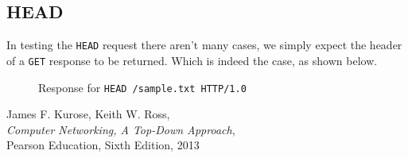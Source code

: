 \documentclass{acm_proc_article-sp}
\newcommand{\code}[1]{{\tt #1}}
\begin{document}
\subsection{HEAD}
In testing the \code{HEAD} request there aren't many cases, we simply expect
the header of a \code{GET} response to be returned. Which is indeed the case,
as shown below.
\begin{figure}[H]
    
    \caption{Response for \code{HEAD /sample.txt HTTP/1.0}}
    \label{fig:head-file}
\end{figure}



\begin{thebibliography}{9}
    
        James F. Kurose, Keith W. Ross,\\
        \emph{Computer Networking, A Top-Down Approach},\\
        Pearson Education, Sixth Edition, 2013
    
\end{thebibliography}
\end{document}
